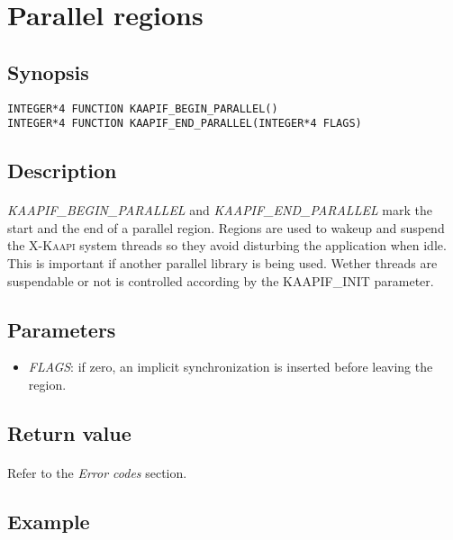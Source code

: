 \documentclass[a4paper, 11pt]{article}
\newcommand{\kaapi}{\textsc{X-Kaapi}\xspace}
\begin{document}
\newpage
\section{Parallel regions}

\subsection{Synopsis}
\begin{small}
\lstset{language=C}
\begin{lstlisting}[frame=tb]
INTEGER*4 FUNCTION KAAPIF_BEGIN_PARALLEL()
INTEGER*4 FUNCTION KAAPIF_END_PARALLEL(INTEGER*4 FLAGS)
\end{lstlisting}
\end{small}

\subsection{Description}
\paragraph{}
\textit{KAAPIF\_BEGIN\_PARALLEL} and \textit{KAAPIF\_END\_PARALLEL} mark the
start and the end of a parallel region. Regions are used to wakeup and suspend
the \kaapi system threads so they avoid disturbing the application when idle.
This is important if another parallel library is being used. Wether threads
are suspendable or not is controlled according by the KAAPIF\_INIT parameter.

\subsection{Parameters}
\begin{itemize}
\item \textit{FLAGS}: if zero, an implicit synchronization is inserted before
leaving the region.
\end{itemize}

\subsection{Return value}
\paragraph{}
Refer to the \textit{Error codes} section.

\subsection{Example}
\end{document}

